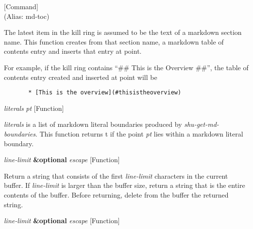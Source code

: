 \vspace{1em}
\noindent
{}
\usebox{\funcname}
 \hfill [Command]\\%
 (Alias: md-toc)

\begin{doc-string}
The latest item in the kill ring is assumed to be the text of a markdown
section name.  This function creates from that section name, a markdown table of
contents entry and inserts that entry at point.

For example, if the kill ring contains ``\#\# This is the Overview \#\#'', the table
of contents entry created and inserted at point will be

\small{\begin{verbatim}
       * [This is the overview](#thisistheoverview)
\end{verbatim}}
\end{doc-string}

\vspace{1em}
\noindent
{}
\usebox{\funcname}\emph{literals} \emph{pt}
 \hfill [Function]

\begin{doc-string}
\emph{literals} is a list of markdown literal boundaries produced by
\emph{shu-get-md-boundaries}.  This function returns t if the point \emph{pt} lies within a
markdown literal boundary.
\end{doc-string}

\vspace{1em}
\noindent
{}
\usebox{\funcname}\emph{line-limit} \textbf{\&optional} \emph{escape}
 \hfill [Function]

\begin{doc-string}
Return a string that consists of the first \emph{line-limit} characters in the
current buffer.  If \emph{line-limit} is larger than the buffer size, return a
string that is the entire contents of the buffer.  Before returning, delete
from the buffer the returned string.
\end{doc-string}

\vspace{1em}
\noindent
{}
\usebox{\funcname}\emph{line-limit} \textbf{\&optional} \emph{escape}
 \hfill [Function]

